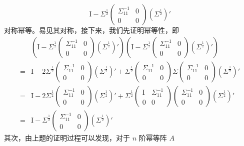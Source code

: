 \documentclass[12pt,hyperref,]{ctexart}
\begin{document}
\begin{equation*}
\mathrm{I}-\Sigma^{\frac 12}
\begin{pmatrix}
\Sigma_{11}^{-1} & 0 \\
0 & 0
\end{pmatrix}(\Sigma^{\frac 12})'
\end{equation*}对称幂等。易见其对称，接下来，我们先证明幂等性，即
\begin{equation*}
\begin{aligned}
& \left(\mathrm{I}-\Sigma^{\frac 12}
\begin{pmatrix}
\Sigma_{11}^{-1} & 0 \\
0 & 0
\end{pmatrix}(\Sigma^{\frac 12})'
\right)\left(\mathrm{I}-\Sigma^{\frac 12}
\begin{pmatrix}
\Sigma_{11}^{-1} & 0 \\
0 & 0
\end{pmatrix}(\Sigma^{\frac 12})'
\right) \\
=& \mathrm{I}-2\Sigma^{\frac 12}
\begin{pmatrix}
\Sigma_{11}^{-1} & 0 \\
0 & 0
\end{pmatrix}(\Sigma^{\frac 12})'+\Sigma^{\frac 12}
\begin{pmatrix}
\Sigma_{11}^{-1} & 0 \\
0 & 0
\end{pmatrix}\Sigma
\begin{pmatrix}
\Sigma_{11}^{-1} & 0 \\
0 & 0
\end{pmatrix}(\Sigma^{\frac 12})' \\
=& \mathrm{I}-2\Sigma^{\frac 12}
\begin{pmatrix}
\Sigma_{11}^{-1} & 0 \\
0 & 0
\end{pmatrix}(\Sigma^{\frac 12})'+\Sigma^{\frac 12}
\begin{pmatrix}
\mathrm{I}& \Sigma_{11}^{-1} \\
0 & 0
\end{pmatrix}
\begin{pmatrix}
\Sigma_{11}^{-1} & 0 \\
0 & 0
\end{pmatrix}(\Sigma^{\frac 12})' \\
=& \mathrm{I}-\Sigma^{\frac 12}
\begin{pmatrix}
\Sigma_{11}^{-1} & 0 \\
0 & 0
\end{pmatrix}(\Sigma^{\frac 12})'
\end{aligned}
\end{equation*}其次，由上题的证明过程可以发现，对于 \(n\) 阶幂等阵 \(A\)
\end{document}
